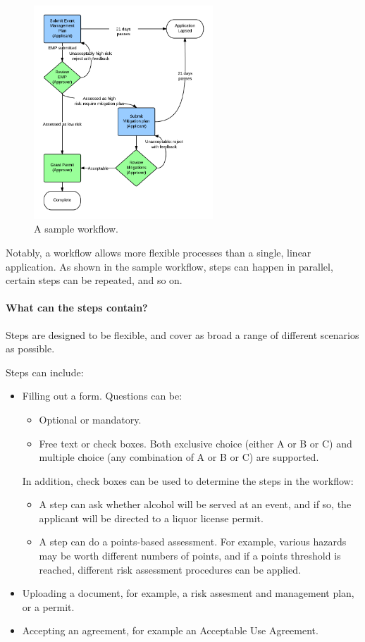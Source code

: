 \documentclass[12pt,a4paper,twosided]{article}
\begin{document}
\begin{figure}[h!]
  \centering
  \includegraphics[width=0.6\textwidth]{sample-workflow.png}  
  \caption{A sample workflow.}
  \label{fig:sample-workflow}
\end{figure}

Notably, a workflow allows more flexible processes than a single, linear application. As shown in the sample workflow, steps can happen in parallel, certain steps can be repeated, and so on.

\paragraph{What can the steps contain?}

Steps are designed to be flexible, and cover as broad a range of different scenarios as possible.

Steps can include:
\begin{itemize}
\item Filling out a form. Questions can be:
  \begin{itemize}
  \item Optional or mandatory.
  \item Free text or check boxes. Both exclusive choice (either A or B or C) and multiple choice (any combination of A or B or C) are supported. 
  \end{itemize}

  In addition, check boxes can be used to determine the steps in the workflow:
  \begin{itemize}
  \item A step can ask whether alcohol will be served at an event, and if so, the applicant will be directed to a liquor license permit.
  \item A step can do a points-based assessment. For example, various hazards may be worth different numbers of points, and if a points threshold is reached, different risk assessment procedures can be applied.
  \end{itemize}
\item Uploading a document, for example, a risk assesment and management plan, or a permit.
\item Accepting an agreement, for example an Acceptable Use Agreement.
\end{itemize}
\end{document}
